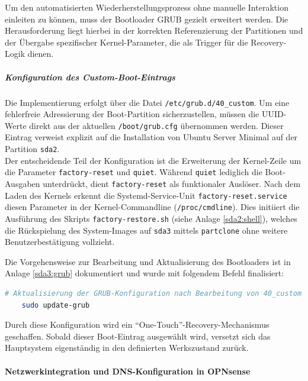 \documentclass[11pt,
a4paper,
numbers=nonperiod,
footsepline,
oneside,
numbers=noenddot,
bibliography=totoc
]{scrartcl}
\begin{document}
Um den automatisierten Wiederherstellungsprozess ohne manuelle Interaktion einleiten zu können, muss der Bootloader GRUB gezielt erweitert werden. Die Herausforderung liegt hierbei in der korrekten Referenzierung der Partitionen und der Übergabe spezifischer Kernel-Parameter, die als Trigger für die Recovery-Logik dienen.

\subparagraph{Konfiguration des Custom-Boot-Eintrags}
Die Implementierung erfolgt über die Datei \linebreak \texttt{/etc/grub.d/40\_custom}. Um eine fehlerfreie Adressierung der Boot-Partition sicherzustellen, müssen die UUID-Werte direkt aus der aktuellen \texttt{/boot/grub.cfg} übernommen werden. Dieser Eintrag verweist explizit auf die Installation von Ubuntu Server Minimal auf der Partition \texttt{sda2}.\\

Der entscheidende Teil der Konfiguration ist die Erweiterung der Kernel-Zeile um die Parameter \linebreak\texttt{factory-reset} und \texttt{quiet}. Während \texttt{quiet} lediglich die Boot-Ausgaben unterdrückt, dient \linebreak\texttt{factory-reset} als funktionaler Auslöser. Nach dem Laden des Kernels erkennt die Systemd-Service-Unit \texttt{factory-reset.service} diesen Parameter in der Kernel-Commandline (\texttt{/proc/cmdline}). Dies initiiert die Ausführung des Skripts \texttt{factory-restore.sh} (siehe Anlage \ref{sda2:shell}), welches die Rückspielung des System-Images auf \texttt{sda3} mittels \texttt{partclone} ohne weitere Benutzerbestätigung vollzieht.

Die Vorgehensweise zur Bearbeitung und Aktualisierung des Bootloaders ist in Anlage \ref{sda3:grub} dokumentiert und wurde mit folgendem Befehl finalisiert:

\begin{lstlisting}[language=bash]
	# Aktualisierung der GRUB-Konfiguration nach Bearbeitung von 40_custom
	sudo update-grub
\end{lstlisting}

Durch diese Konfiguration wird ein "`One-Touch"'-Recovery-Mechanismus geschaffen. Sobald dieser Boot-Eintrag ausgewählt wird, versetzt sich das Hauptsystem eigenständig in den definierten Werkszustand zurück.

\paragraph{Netzwerkintegration und DNS-Konfiguration in OPNsense}
\end{document}
